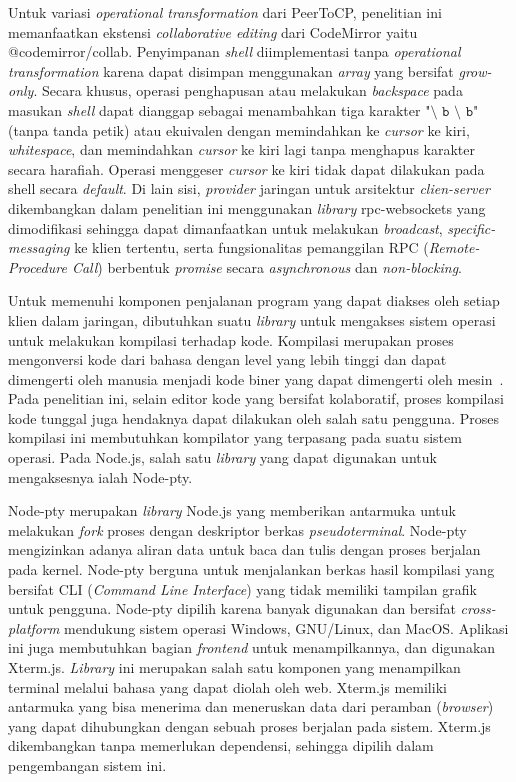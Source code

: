 Untuk variasi \textit{operational transformation} dari PeerToCP, penelitian ini memanfaatkan ekstensi \textit{collaborative editing} dari CodeMirror yaitu @codemirror/collab. Penyimpanan \textit{shell} diimplementasi tanpa \textit{operational transformation} karena dapat disimpan menggunakan \textit{array} yang bersifat \textit{grow-only}. Secara khusus, operasi penghapusan atau melakukan \textit{backspace} pada masukan \textit{shell} dapat dianggap sebagai menambahkan tiga karakter "$\texttt{\char`\\ b \char`\\ b}$" (tanpa tanda petik) atau ekuivalen dengan memindahkan ke \textit{cursor} ke kiri, \textit{whitespace}, dan memindahkan \textit{cursor} ke kiri lagi tanpa menghapus karakter secara harafiah. Operasi menggeser \textit{cursor} ke kiri tidak dapat dilakukan pada shell secara \textit{default}. Di lain sisi, \textit{provider} jaringan untuk arsitektur \textit{clien-server} dikembangkan dalam penelitian ini menggunakan \textit{library} rpc-websockets yang dimodifikasi sehingga dapat dimanfaatkan untuk melakukan \textit{broadcast}, \textit{specific-messaging} ke klien tertentu, serta fungsionalitas pemanggilan RPC (\textit{Remote-Procedure Call}) berbentuk \textit{promise} secara \textit{asynchronous} dan \textit{non-blocking}.

Untuk memenuhi komponen penjalanan program yang dapat diakses oleh setiap klien dalam jaringan, dibutuhkan suatu \textit{library} untuk mengakses sistem operasi untuk melakukan kompilasi terhadap kode. Kompilasi merupakan proses mengonversi kode dari bahasa dengan level yang lebih tinggi dan dapat dimengerti oleh manusia menjadi kode biner yang dapat dimengerti oleh mesin~\citep{aho1985compilers}. Pada penelitian ini, selain editor kode yang bersifat kolaboratif, proses kompilasi kode tunggal juga hendaknya dapat dilakukan oleh salah satu pengguna. Proses kompilasi ini membutuhkan kompilator yang terpasang pada suatu sistem operasi. Pada Node.js, salah satu \textit{library} yang dapat digunakan untuk mengaksesnya ialah Node-pty.

Node-pty merupakan \textit{library} Node.js yang memberikan antarmuka untuk melakukan \textit{fork} proses dengan deskriptor berkas \textit{pseudoterminal}. Node-pty mengizinkan adanya aliran data untuk baca dan tulis dengan proses berjalan pada kernel. Node-pty berguna untuk menjalankan berkas hasil kompilasi yang bersifat CLI (\textit{Command Line Interface}) yang tidak memiliki tampilan grafik untuk pengguna. Node-pty dipilih karena banyak digunakan dan bersifat \textit{cross-platform} mendukung sistem operasi Windows, GNU/Linux, dan MacOS. Aplikasi ini juga membutuhkan bagian \textit{frontend} untuk menampilkannya, dan digunakan Xterm.js. \textit{Library} ini merupakan salah satu komponen yang menampilkan terminal melalui bahasa yang dapat diolah oleh web. Xterm.js memiliki antarmuka yang bisa menerima dan meneruskan data dari peramban (\textit{browser}) yang dapat dihubungkan dengan sebuah proses berjalan pada sistem. Xterm.js dikembangkan tanpa memerlukan dependensi, sehingga dipilih dalam pengembangan sistem ini.

